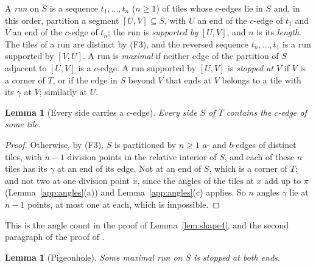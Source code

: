 \documentclass[11pt]{amsart}
\newtheorem{lemma}[theorem]{Lemma}
\theoremstyle{remark}
\begin{document}
A \emph{run} on $S$ is a sequence $t_1,\dots,t_n$ ($n\ge1$) of tiles whose $c$-edges lie in $S$ and, in this order, partition a segment $[U,V]\subseteq S$, with $U$ an end of the $c$-edge of $t_1$ and $V$ an end of the $c$-edge of $t_n$; the run is \emph{supported by} $[U,V]$, and $n$ is its \emph{length}. The tiles of a run are distinct by (F3), and the reversed sequence $t_n,\dots,t_1$ is a run supported by $[V,U]$. A run is \emph{maximal} if neither edge of the partition of $S$ adjacent to $[U,V]$ is a $c$-edge. A run supported by $[U,V]$ is \emph{stopped at $V$} if $V$ is a corner of $T$, or if the edge in $S$ beyond $V$ that ends at $V$ belongs to a tile with its $\gamma$ at $V$; similarly at $U$.

\begin{lemma}[Every side carries a $c$-edge]\label{app:C}
Every side $S$ of $T$ contains the $c$-edge of some tile.
\end{lemma}

\begin{proof}
Otherwise, by (F3), $S$ is partitioned by $n\ge1$ $a$- and $b$-edges of distinct tiles, with $n-1$ division points in the relative interior of $S$, and each of these $n$ tiles has its $\gamma$ at an end of its edge. Not at an end of $S$, which is a corner of $T$; and not two at one division point $x$, since the angles of the tiles at $x$ add up to $\pi$ (Lemma~\ref{app:angles}(a)) and Lemma~\ref{app:angles}(c) applies. So $n$ angles $\gamma$ lie at $n-1$ points, at most one at each, which is impossible.
\end{proof}

This is the angle count in the proof of Lemma~\ref{lem:shape4}, and the second paragraph of the proof of \cite[Lemma~31]{BR}.

\begin{lemma}[Pigeonhole]\label{app:PH}
Some maximal run on $S$ is stopped at both ends.
\end{lemma}
\end{document}
